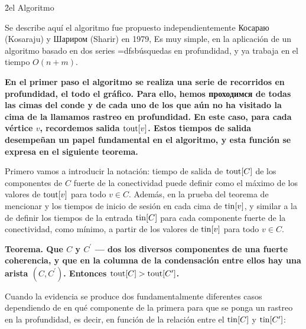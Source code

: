 \h2{el Algoritmo}

Se describe aquí el algoritmo fue propuesto independientemente Косараю (Kosaraju) y Шариром (Sharir) en 1979, Es muy simple, en la aplicación de un algoritmo basado en dos series \algohref=dfs{búsquedas en profundidad}, y ya trabaja en el tiempo $O(n+m)$.

\bf{En el primer paso} el algoritmo se realiza una serie de recorridos en profundidad, el todo el gráfico. Para ello, hemos проходимся de todas las cimas del conde y de cada uno de los que aún no ha visitado la cima de la llamamos rastreo en profundidad. En este caso, para cada vértice $v$, recordemos \bf{salida} ${\rm tout}[v]$. Estos tiempos de salida desempeñan un papel fundamental en el algoritmo, y esta función se expresa en el siguiente teorema.

Primero vamos a introducir la notación: tiempo de salida de ${\rm tout}[C]$ de los componentes de $C$ fuerte de la conectividad puede definir como el máximo de los valores de ${\rm tout}[v]$ para todo $v \in C$. Además, en la prueba del teorema de mencionar y los tiempos de inicio de sesión en cada cima de ${\rm tin}[v]$, y similar a la de definir los tiempos de la entrada ${\rm tin}[C]$ para cada componente fuerte de la conectividad, como mínimo, a partir de los valores de ${\rm tin}[v]$ para todo $v \in C$.

\bf{Teorema}. Que $C$ y $C^\prime$ --- dos los diversos componentes de una fuerte coherencia, y que en la columna de la condensación entre ellos hay una arista $(C,C^\prime)$. Entonces ${\rm tout}[C] > {\rm tout}[C^\prime]$.

Cuando la evidencia se produce dos fundamentalmente diferentes casos dependiendo de en qué componente de la primera para que se ponga un rastreo en la profundidad, es decir, en función de la relación entre el ${\rm tin}[C]$ y ${\rm tin}[C^\prime]$:

